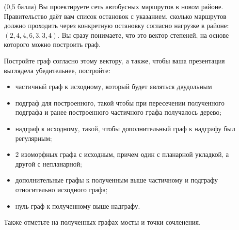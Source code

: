 \question
(0,5 балла) Вы проектируете сеть автобусных маршрутов в новом районе. Правительство даёт вам список остановок с указанием, сколько маршрутов должно проходить через конкретную остановку согласно нагрузке в районе: $(2, 4, 4, 6, 3, 3, 4)$. Вы сразу понимаете, что это вектор степеней, на основе которого можно построить граф.

Постройте граф согласно этому вектору, а также, чтобы ваша презентация выглядела убедительнее, постройте:

\begin{itemize}
\item частичный граф к исходному, который будет являться двудольным
\item подграф для построенного, такой чтобы при пересечении полученного подграфа и ранее построенного частичного графа получалось дерево;
\item надграф к исходному, такой, чтобы дополнительный граф к надграфу был регулярным;
\item 2 изоморфных графа с исходным, причем один с планарной укладкой, а другой с непланарной;
\item дополнительные графы к полученным выше частичному и подграфу относительно исходного графа;
\item нуль-граф к полученному выше надграфу.
\end{itemize}

Также отметьте на полученных графах мосты и точки сочленения.
